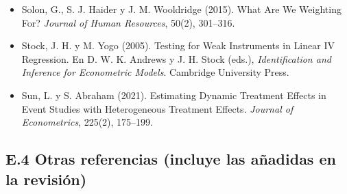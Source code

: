 \documentclass[11pt,a4paper]{article}
\begin{document}
{\begin{itemize}[leftmargin=1.4em,itemsep=1pt,label={}]
\item Solon, G., S. J. Haider y J. M. Wooldridge (2015). What Are We Weighting For? \emph{Journal of Human Resources}, 50(2), 301--316.
\item Stock, J. H. y M. Yogo (2005). Testing for Weak Instruments in Linear IV Regression. En D. W. K. Andrews y J. H. Stock (eds.), \emph{Identification and Inference for Econometric Models}. Cambridge University Press.
\item Sun, L. y S. Abraham (2021). Estimating Dynamic Treatment Effects in Event Studies with Heterogeneous Treatment Effects. \emph{Journal of Econometrics}, 225(2), 175--199.
\end{itemize}
}

\subsection*{E.4 Otras referencias (incluye las añadidas en la revisión)}
\end{document}
